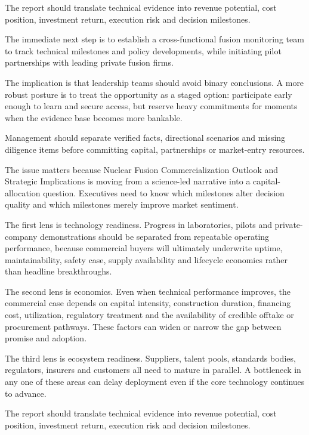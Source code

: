 \documentclass[10pt,a4paper]{article}
\begin{document}
{\small The report should translate technical evidence into revenue potential, cost position, investment return, execution risk and decision milestones.}\par
{\small The immediate next step is to establish a cross-functional fusion monitoring team to track technical milestones and policy developments, while initiating pilot partnerships with leading private fusion firms.}\par
{\small The implication is that leadership teams should avoid binary conclusions. A more robust posture is to treat the opportunity as a staged option: participate early enough to learn and secure access, but reserve heavy commitments for moments when the evidence base becomes more bankable.}\par
{}\par\vspace{1pt}
{\small Management should separate verified facts, directional scenarios and missing diligence items before committing capital, partnerships or market-entry resources.}\par
{\small The issue matters because Nuclear Fusion Commercialization Outlook and Strategic Implications is moving from a science-led narrative into a capital-allocation question. Executives need to know which milestones alter decision quality and which milestones merely improve market sentiment.}\par
{\small The first lens is technology readiness. Progress in laboratories, pilots and private-company demonstrations should be separated from repeatable operating performance, because commercial buyers will ultimately underwrite uptime, maintainability, safety case, supply availability and lifecycle economics rather than headline breakthroughs.}\par
{\small The second lens is economics. Even when technical performance improves, the commercial case depends on capital intensity, construction duration, financing cost, utilization, regulatory treatment and the availability of credible offtake or procurement pathways. These factors can widen or narrow the gap between promise and adoption.}\par
{\small The third lens is ecosystem readiness. Suppliers, talent pools, standards bodies, regulators, insurers and customers all need to mature in parallel. A bottleneck in any one of these areas can delay deployment even if the core technology continues to advance.}\par
{}\par\vspace{1pt}
{\small The report should translate technical evidence into revenue potential, cost position, investment return, execution risk and decision milestones.}\par
\label{chap:4:end}
\end{document}
